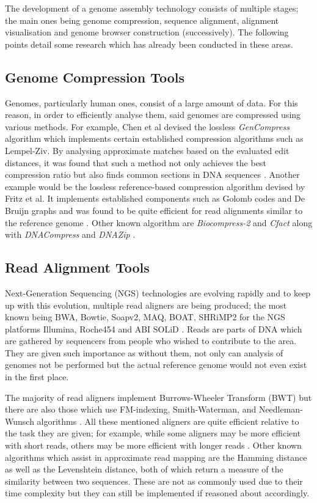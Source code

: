 \documentclass{csfyp}
\begin{document}
The development of a genome assembly technology consists of multiple stages; the main ones being genome compression, sequence alignment, alignment visualisation and genome browser construction (successively).  The following points detail some research which has already been conducted in these areas.

\subsection{Genome Compression Tools}\vspace{-2ex}
Genomes, particularly human ones, consist of a large amount of data.  For this reason, in order to efficiently analyse them, said genomes are compressed using various methods.  For example, Chen et al devised the lossless {\textit{GenCompress}} algorithm which implements certain established compression algorithms such as Lempel-Ziv.  By analysing approximate matches based on the evaluated edit distances, it was found that such a method not only achieves the best compression ratio but also finds common sections in DNA sequences \cite{gencompress}.  Another example would be the lossless reference-based compression algorithm devised by Fritz et al.  It implements established components such as Golomb codes and De Bruijn graphs and was found to be quite efficient for read alignments similar to the reference genome \cite{refcompression}.  Other known algorithm are {\textit{Biocompress-2}} and {\textit{Cfact}} \cite{gencompress} along with {\textit{DNACompress}} and {\textit{ DNAZip}} \cite{refcompression}.          

\subsection{Read Alignment Tools}\vspace{-2ex}
Next-Generation Sequencing (NGS) technologies are evolving rapidly and to keep up with this evolution, multiple read aligners are being produced; the most known being BWA, Bowtie, Soapv2, MAQ, BOAT, SHRiMP2 for the NGS platforms Illumina, Roche454 and ABI SOLiD \cite{bwtransform, popgen, cgreads}.  Reads are parts of DNA which are gathered by sequencers from people who wished to contribute to the area.  They are given such importance as without them, not only can analysis of genomes not be performed but the actual reference genome would not even exist in the first place.   

The majority of read aligners implement Burrows-Wheeler Transform (BWT) but there are also those which use FM-indexing, Smith-Waterman,  and Needleman-Wunsch algorithms \cite{bwtransform, popgen, cgreads}.  All these mentioned aligners are quite efficient relative to the task they are given; for example, while some aligners may be more efficient with short reads, others may be more efficient with longer reads \cite{companalys, compalign}.  Other known algorithms which assist in approximate read mapping are the Hamming distance as well as the Levenshtein distance, both of which return a measure of the similarity between two sequences.  These are not as commonly used due to their time complexity but they can still be implemented if reasoned about accordingly.
\end{document}
